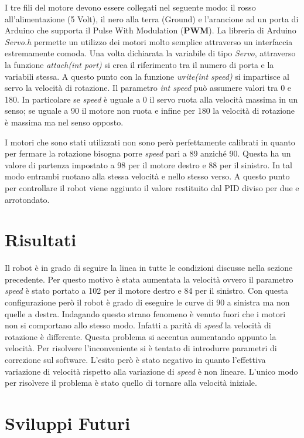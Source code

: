 \documentclass[twoside,twocolumn]{article}
\begin{document}
I tre fili del motore devono essere collegati nel seguente modo: il rosso all'alimentazione (5 Volt), il nero alla terra (Ground) e l'arancione ad un porta di Arduino che supporta il Pulse With Modulation (\textbf{PWM}). La libreria di Arduino \textit{Servo.h} permette un utilizzo dei motori molto semplice attraverso un interfaccia estremamente comoda. Una volta dichiarata la variabile di tipo \textit{Servo}, attraverso la funzione \textit{attach(int port)} si crea il riferimento tra il numero di porta e la variabili stessa. A questo punto con la funzione \textit{write(int speed)} si impartisce al servo la velocità di rotazione. Il parametro \textit{int speed} può assumere valori tra 0 e 180. In particolare se \textit{speed} è uguale a 0 il servo ruota alla velocità massima in un senso; se uguale a 90 il motore non ruota e infine per 180 la velocità di rotazione è massima ma nel senso opposto. 

I motori che sono stati utilizzati non sono però perfettamente calibrati in quanto per fermare la rotazione bisogna porre \textit{speed} pari a 89 anziché 90. Questa ha un valore di partenza impostato a 98 per il motore destro e 88 per il sinistro. In tal modo entrambi ruotano alla stessa velocità e nello stesso verso. A questo punto per controllare il robot viene aggiunto il valore restituito dal PID diviso per due e arrotondato. 

\section{Risultati}

Il robot è in grado di seguire la linea in tutte le condizioni discusse nella sezione precedente. Per questo motivo è stata aumentata la velocità ovvero il parametro \textit{speed} è stato portato a 102 per il motore destro e 84 per il sinistro. Con questa configurazione però il robot è grado di eseguire le curve di 90 a sinistra ma non quelle a destra. Indagando questo strano fenomeno è venuto fuori che i motori non si comportano allo stesso modo. Infatti a parità di \textit{speed} la velocità di rotazione è differente. Questa problema si accentua aumentando appunto la velocità. Per risolvere l'inconveniente si è tentato di introdurre parametri di correzione sul software. L'esito però è stato negativo in quanto l'effettiva variazione di velocità rispetto alla variazione di \textit{speed} è non lineare. L'unico modo per risolvere il problema è stato quello di tornare alla velocità iniziale.

\section{Sviluppi Futuri}
\end{document}
